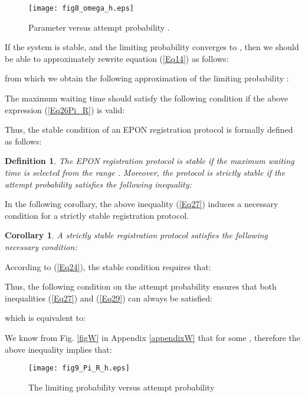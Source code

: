 \documentclass[journal]{IEEEtran}
\newtheorem{corollary}{\textbf{Corollary}}
\newtheorem{definition}{\textbf{Definition}}
\begin{document}
\begin{figure}[t]
\centering
\texttt{[image: fig8\_omega\_h.eps]}
\caption{Parameter  versus  attempt probability .}\label{fig8_omega_h}
\end{figure}

If the system is stable, and the limiting probability  converges to , then we should be able to approximately rewrite equation (\ref{Eq14}) as follows:

from which we obtain the following approximation of the limiting probability :

The maximum waiting time  should satisfy the following condition if the above expression (\ref{Eq26Pi_R}) is valid:

Thus, the stable condition of an EPON registration protocol is formally defined as follows:
\begin{definition}\label{stable_condition}
  \emph{The EPON registration protocol is stable if the maximum waiting time  is selected from the range . Moreover, the protocol is strictly stable if the attempt probability  satisfies the following inequality:}

\end{definition}
In the following corollary, the above inequality (\ref{Eq27}) induces a necessary condition for a strictly stable registration protocol.
\begin{corollary}\label{corollary1}
  A strictly stable registration protocol satisfies the following necessary condition:

\end{corollary}
\begin{IEEEproof}
According to (\ref{Eq24}), the stable condition requires that:

Thus, the following condition on the attempt probability  ensures that both inequalities (\ref{Eq27}) and (\ref{Eq29}) can always be satisfied:

which is equivalent to:

We know from Fig. \ref{figW} in Appendix \ref{appendixW} that   for some , therefore the above inequality implies that:

\end{IEEEproof}

\begin{figure}[t]
\centering
\texttt{[image: fig9\_Pi\_R\_h.eps]}
\caption{The limiting probability  versus attempt probability }\label{fig9_Pi_R_h}
\end{figure}
\end{document}
